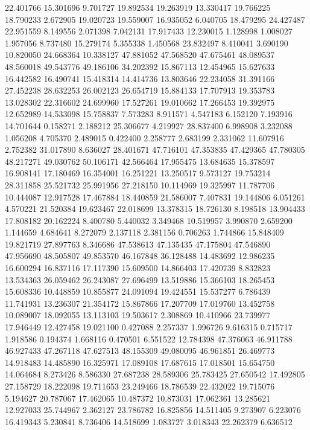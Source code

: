 22.401766
15.301696
9.701727
19.892534
19.263919
13.330417
19.766225
18.790233
2.672905
19.020723
19.559007
16.935052
6.040705
18.479295
24.427487
22.951559
8.149556
2.071398
7.042131
17.917433
12.230015
1.128998
1.008027
1.957056
8.737480
15.279174
5.355338
1.450568
23.832497
8.410041
3.690190
10.820050
24.668364
10.338127
47.881052
47.568520
47.675461
48.089537
48.560018
49.543776
49.186106
34.202392
15.867113
12.454965
15.627633
16.442582
16.490741
15.418314
14.414736
13.803646
22.234058
31.391166
27.452238
28.632253
26.002123
26.654719
15.884133
17.707913
19.353783
13.028302
22.316602
24.699960
17.527261
19.010662
17.266453
19.392975
12.652989
14.533098
15.758837
7.573283
8.911571
4.547183
6.152120
7.193916
14.701644
0.158271
2.188212
25.306677
4.219927
28.837400
6.998908
3.232088
1.056208
4.705370
2.489015
0.422400
2.258777
2.683199
2.331062
11.607916
2.752382
31.017890
8.636027
28.401671
47.716101
47.353835
47.429365
47.780305
48.217271
49.030762
50.106171
42.566464
17.955475
13.684635
15.378597
16.908141
17.180469
16.354001
16.251221
13.250517
9.573127
19.753214
28.311858
25.521732
25.991956
27.218150
10.114969
19.325997
11.787706
10.444087
12.917528
17.467884
18.440859
21.586007
7.407831
19.144806
6.051261
4.570221
21.520384
19.623467
22.018699
13.378315
18.726130
8.198518
13.904433
17.808182
20.162224
8.400780
5.440032
3.349468
10.519957
3.990870
2.659200
1.144659
4.684641
8.272079
2.137118
2.381156
0.706263
1.744866
15.848409
19.821719
27.897763
8.346686
47.538613
47.135435
47.175804
47.546890
47.956690
48.505807
49.853570
46.167848
36.128488
14.483692
12.986235
16.600294
16.837116
17.117390
15.609500
14.866403
17.420739
8.832823
13.534363
26.059462
26.243087
27.696499
13.519886
15.366103
18.265453
15.608336
10.448859
10.855877
24.091094
19.424551
15.537277
6.786439
11.741931
13.236307
21.354172
15.867866
17.207709
17.019760
13.452758
10.089007
18.092055
13.113103
19.503617
2.308869
10.410966
23.739977
17.946449
12.427458
19.021100
0.427088
2.257337
1.996726
9.616315
0.715717
1.918586
0.194374
1.668116
0.470501
6.551522
12.784398
47.376063
46.911788
46.927433
47.267118
47.627513
48.155309
49.080095
46.961851
26.469773
14.918483
14.485890
16.325971
17.089108
17.687615
17.018501
15.654750
14.064684
8.273426
8.586330
27.687238
28.589306
25.783425
27.650542
17.492805
27.158729
18.222098
19.711653
23.249466
18.786539
22.432022
19.715076
5.194627
20.787067
17.462065
10.487372
10.873031
17.062361
13.285621
12.927033
25.744967
2.362127
23.786782
16.825856
14.511405
9.273907
6.223076
16.419343
5.230841
8.736406
14.518699
1.083727
3.018343
22.262379
6.636512
